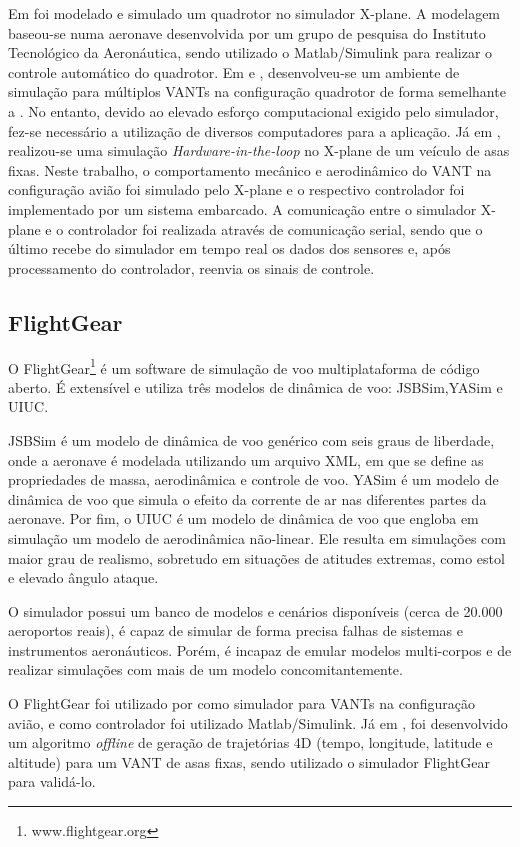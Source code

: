 Em \cite{Figueiredo2012} foi modelado e simulado um quadrotor no simulador X-plane. A modelagem baseou-se numa aeronave desenvolvida por um grupo de pesquisa do Instituto Tecnológico da Aeronáutica, sendo utilizado o Matlab/Simulink para realizar o controle automático do quadrotor. Em \cite{Castro2014} e \cite{Garcia2010}, desenvolveu-se um ambiente de simulação para múltiplos VANTs na configuração quadrotor de forma semelhante a \cite{Figueiredo2012}. No entanto, devido ao elevado esforço computacional exigido pelo simulador, fez-se necessário a utilização de diversos computadores para a aplicação. Já em \cite{Bittar2014}, realizou-se uma simulação \textit{Hardware-in-the-loop} no X-plane de um veículo de asas fixas. Neste trabalho, o comportamento mecânico e aerodinâmico do VANT na configuração avião foi simulado pelo X-plane e o respectivo controlador foi implementado por um sistema embarcado. A comunicação entre o simulador X-plane e o controlador foi realizada através de comunicação serial, sendo que o último recebe do simulador em tempo real os dados dos sensores e, após processamento do controlador, reenvia os sinais de controle.

\subsection{FlightGear}

O FlightGear\footnote{www.flightgear.org} é um software de simulação de voo multiplataforma de código aberto. É extensível e utiliza três modelos de dinâmica de voo: JSBSim,YASim e UIUC. 

JSBSim é um modelo de dinâmica de voo genérico com seis graus de liberdade, onde a aeronave é modelada utilizando um arquivo XML, em que se define as propriedades de massa, aerodinâmica e controle de voo. YASim é um modelo de dinâmica de voo que simula o efeito da corrente de ar nas diferentes partes da aeronave. Por fim, o UIUC é um modelo de dinâmica de voo que engloba em simulação um modelo de aerodinâmica não-linear. Ele resulta em simulações com maior grau de realismo, sobretudo em situações de atitudes extremas, como estol e elevado ângulo ataque.

O simulador possui um banco de modelos e cenários disponíveis (cerca de 20.000 aeroportos reais), é capaz de simular de forma precisa falhas de sistemas e instrumentos aeronáuticos. Porém, é incapaz de emular modelos multi-corpos e de realizar simulações com mais de um modelo concomitantemente.    

O FlightGear foi utilizado por \cite{Sorton2005} como simulador para VANTs na configuração avião, e como controlador foi utilizado Matlab/Simulink. Já em \cite{Butt01052016}, foi desenvolvido um algoritmo \textit{offline} de geração de trajetórias 4D (tempo, longitude, latitude e altitude) para um VANT de asas fixas, sendo utilizado o simulador FlightGear para validá-lo.

